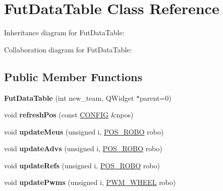 \hypertarget{classFutDataTable}{}\section{Fut\+Data\+Table Class Reference}
\label{classFutDataTable}


Inheritance diagram for Fut\+Data\+Table\+:


Collaboration diagram for Fut\+Data\+Table\+:
\subsection*{Public Member Functions}
\begin{DoxyCompactItemize}
\item 
{\bfseries Fut\+Data\+Table} (int new\+\_\+team, Q\+Widget $\ast$parent=0)\hypertarget{classFutDataTable_a2f45e129ca1ce6e9cad82a6855c26f8e}{}\label{classFutDataTable_a2f45e129ca1ce6e9cad82a6855c26f8e}

\item 
void {\bfseries refresh\+Pos} (const \hyperlink{structCONFIG}{C\+O\+N\+F\+IG} \&npos)\hypertarget{classFutDataTable_a9e223d87e6097978110fa6f2bbf58017}{}\label{classFutDataTable_a9e223d87e6097978110fa6f2bbf58017}

\item 
void {\bfseries update\+Meus} (unsigned i, \hyperlink{structPOS__ROBO}{P\+O\+S\+\_\+\+R\+O\+BO} robo)\hypertarget{classFutDataTable_ab3777b6f0665ee6c6773d82fdbb6eaa6}{}\label{classFutDataTable_ab3777b6f0665ee6c6773d82fdbb6eaa6}

\item 
void {\bfseries update\+Advs} (unsigned i, \hyperlink{structPOS__ROBO}{P\+O\+S\+\_\+\+R\+O\+BO} robo)\hypertarget{classFutDataTable_a520b350594c6aba1f5cf1e77b1fa5aa1}{}\label{classFutDataTable_a520b350594c6aba1f5cf1e77b1fa5aa1}

\item 
void {\bfseries update\+Refs} (unsigned i, \hyperlink{structPOS__ROBO}{P\+O\+S\+\_\+\+R\+O\+BO} robo)\hypertarget{classFutDataTable_adad64a3260442fa01972962e16fe0675}{}\label{classFutDataTable_adad64a3260442fa01972962e16fe0675}

\item 
void {\bfseries update\+Pwms} (unsigned i, \hyperlink{structPWM__WHEEL}{P\+W\+M\+\_\+\+W\+H\+E\+EL} robo)\hypertarget{classFutDataTable_a9e4a1fbecbde5d3a3bc7c891f89f95b4}{}\label{classFutDataTable_a9e4a1fbecbde5d3a3bc7c891f89f95b4}


\end{DoxyCompactItemize}

